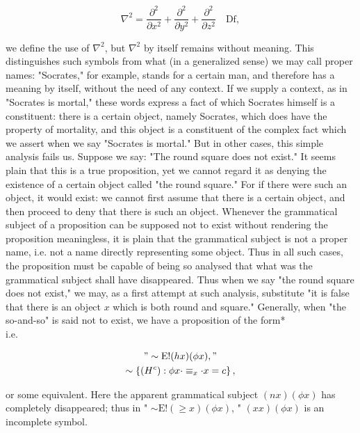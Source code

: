 \documentclass[10pt]{article}
\begin{document}
$$
\nabla^{2}=\frac{\partial^{2}}{\partial x^{2}}+\frac{\partial^{2}}{\partial y^{2}}+\frac{\partial^{2}}{\partial z^{2}} \quad \mathrm{Df},
$$

we define the use of $\nabla^{2}$, but $\nabla^{2}$ by itself remains without meaning. This distinguishes such symbols from what (in a generalized sense) we may call proper names: "Socrates," for example, stands for a certain man, and therefore has a meaning by itself, without the need of any context. If we supply a context, as in "Socrates is mortal," these words express a fact of which Socrates himself is a constituent: there is a certain object, namely Socrates, which does have the property of mortality, and this object is a constituent of the complex fact which we assert when we say "Socrates is mortal." But in other cases, this simple analysis fails us. Suppose we say: "The round square does not exist." It seems plain that this is a true proposition, yet we cannot regard it as denying the existence of a certain object called "the round square." For if there were such an object, it would exist: we cannot first assume that there is a certain object, and then proceed to deny that there is such an object. Whenever the grammatical subject of a proposition can be supposed not to exist without rendering the proposition meaningless, it is plain that the grammatical subject is not a proper name, i.e. not a name directly representing some object. Thus in all such cases, the proposition must be capable of being so analysed that what was the grammatical subject shall have disappeared. Thus when we say "the round square does not exist," we may, as a first attempt at such analysis, substitute "it is false that there is an object $x$ which is both round and square." Generally, when "the so-and-so" is said not to exist, we have a proposition of the form*\\
i.e.

$$
\begin{gathered}
" \sim \mathrm{E}!(h x)(\phi x), " \\
\sim\left\{\left(H^{c}\right): \phi x \cdot \equiv_{x} \cdot x=c\right\},
\end{gathered}
$$

or some equivalent. Here the apparent grammatical subject $(n x)(\phi x)$ has completely disappeared; thus in " $\sim \mathrm{E}!(\geqslant x)(\phi x)$, " $(x x)(\phi x)$ is an incomplete symbol.
\end{document}
